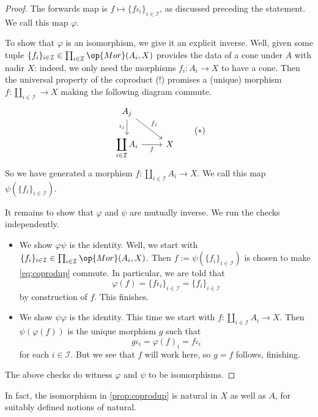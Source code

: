 \documentclass[../notes.tex]{subfiles}
\begin{document}
\begin{proof}
	The forwards map is $f\mapsto\{f\iota_i\}_{i\in\mathcal I}$, as discussed preceding the statement. We call this map $\varphi$.

	To show that $\varphi$ is an isomorphism, we give it an explicit inverse. Well, given some tuple $\{f_i\}_{i\in\mathcal I}\in\prod_{i\in\mathcal I}\op{Mor}(A_i,X)$ provides the data of a cone under $A$ with nadir $X$: indeed, we only need the morphisms $f_i:A_i\to X$ to have a cone. Then the universal property of the coproduct (!) promises a (unique) morphism $f:\coprod_{i\in\mathcal I}\to X$ making the following diagram commute.
	\[\begin{tikzcd}
		{A_j} \\
		{\displaystyle\coprod_{i\in\mathcal I}A_i} & X
		\arrow["{\iota_j}"', from=1-1, to=2-1]
		\arrow["{f_j}", from=1-1, to=2-2]
		\arrow["f"', from=2-1, to=2-2]
	\end{tikzcd}\tag{$*$}\label{eq:coprodup}\]
	So we have generated a morphism $f:\coprod_{i\in\mathcal I}A_i\to X$. We call this map $\psi\left(\{f_i\}_{i\in\mathcal I}\right)$.

	It remains to show that $\varphi$ and $\psi$ are mutually inverse. We run the checks independently.
	\begin{itemize}
		\item We show $\varphi\psi$ is the identity. Well, we start with $\{f_i\}_{i\in\mathcal I}\in\prod_{i\in\mathcal I}\op{Mor}(A_i,X)$. Then $f:=\psi\left(\{f_i\}_{i\in\mathcal I}\right)$ is chosen to make \autoref{eq:coprodup} commute. In particular, we are told that
		\[\varphi(f)=\{f\iota_i\}_{i\in\mathcal I}=\{f_i\}_{i\in\mathcal I}\]
		by construction of $f$. This finishes.
		\item We show $\psi\varphi$ is the identity. This time we start with $f:\coprod_{i\in\mathcal I}A_i\to X$. Then $\psi(\varphi(f))$ is the unique morphism $g$ such that
		\[g\iota_i=\varphi(f)_i=f\iota_i\]
		for each $i\in\mathcal I$. But we see that $f$ will work here, so $g=f$ follows, finishing.
	\end{itemize}
	The above checks do witness $\varphi$ and $\psi$ to be isomorphisms.
\end{proof}
\begin{remark}
	In fact, the isomorphism in \autoref{prop:coprodup} is natural in $X$ as well as $A$, for suitably defined notions of natural.
\end{remark}
\end{document}
